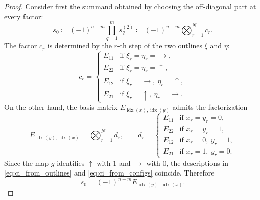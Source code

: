 \documentclass{article}
\begin{document}
\begin{proof}
Consider first the summand obtained by choosing the off-diagonal part at every factor:
\[
s_0\coloneqq (-1)^{n-m}\prod_{q=1}^{m}\overline{s}_q^{(2)}
      \coloneqq(-1)^{n-m}\bigotimes_{r=1}^{N}c_r.
\]
The factor $c_r$ is determined by the $r$-th step of the two outlines $\xi$ and $\eta$:
\begin{equation}
\label{eq:ci_from_outlines}
c_r=
\begin{cases}
E_{11} & \text{if } \xi_r=\eta_r=\rightarrow,\\
E_{22} & \text{if } \xi_r=\eta_r=\uparrow,\\
E_{12} & \text{if } \xi_r=\rightarrow,\ \eta_r=\uparrow,\\
E_{21} & \text{if } \xi_r=\uparrow,\ \eta_r=\rightarrow.
\end{cases}
\end{equation}
On the other hand, the basis matrix $E_{\operatorname{idx}(x),\operatorname{idx}(y)}$ admits the factorization
\begin{equation}
\label{eq:ci_from_configs}
E_{\operatorname{idx}(y),\operatorname{idx}(x)}=\bigotimes_{r=1}^{N}d_r,
\qquad
d_r=
\begin{cases}
E_{11} & \text{if } x_r=y_r=0,\\
E_{22} & \text{if } x_r=y_r=1,\\
E_{12} & \text{if } x_r=0,\ y_r=1,\\
E_{21} & \text{if } x_r=1,\ y_r=0.
\end{cases}
\end{equation}
Since the map $g$ identifies $\uparrow$ with $1$ and $\rightarrow$ with $0$, the descriptions in \eqref{eq:ci_from_outlines} and \eqref{eq:ci_from_configs} coincide. Therefore
\[
s_0=(-1)^{n-m}E_{\operatorname{idx}(y),\ \operatorname{idx}(x)}.
\]


\end{proof}
\end{document}
